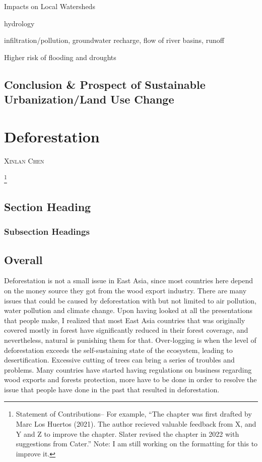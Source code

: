 \documentclass{book}\usepackage{knitr}
\makeatletter
\newcommand{\chapterauthor}[1]{%
  {\parindent0pt\vspace*{-25pt}%
  \linespread{1.1}\large\scshape#1%
  \par\nobreak\vspace*{35pt}}
  \@afterheading%
}
\makeatother
\begin{document}
Impacts on Local Watersheds

hydrology 

infiltration/pollution, groundwater recharge, flow of river basins, runoff

Higher risk of flooding and droughts

\section{Conclusion \& Prospect of Sustainable Urbanization/Land Use Change}


\chapter{Deforestation}\label{ch:deforestation}

\chapterauthor{Xinlan Chen}

\footnote{Statement of Contributions-- For example, ``The chapter was first drafted by Marc Los Huertos (2021). The author recieved valuable feedback from X, and Y and Z to improve the chapter. Slater revised the chapter in 2022 with suggestions from Cater.'' Note: I am still working on the formatting for this to improve it.}

\section{Section Heading}%

\subsection{Subsection Headings} %





\section{Overall}
Deforestation is not a small issue in East Asia, since most countries here depend on the money source they got from the wood export industry. There are many issues that could be caused by deforestation with but not limited to air pollution, water pollution and climate change. Upon having looked at all the presentations that people make, I realized that most East Asia countries that was originally covered mostly in forest have significantly reduced in their forest coverage, and nevertheless, natural is punishing them for that. Over-logging is when the level of deforestation exceeds the self-sustaining state of the ecosystem, leading to desertification. Excessive cutting of trees can bring a series of troubles and problems. Many countries have started having regulations on business regarding wood exports and forests protection, more have to be done in order to resolve the issue that people have done in the past that resulted in deforestation. 
\end{document}
